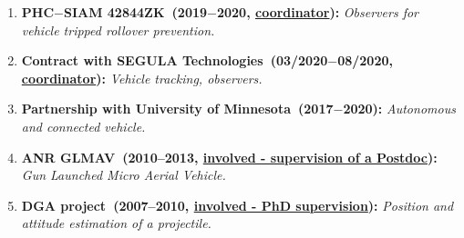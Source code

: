 \documentclass[a4paper,11pt]{article}
\begin{document}
 \begin{small}
\begin{enumerate}[leftmargin=.2in,noitemsep,nolistsep]
\item {\bf PHC$-$SIAM 42844ZK~(2019$-$2020, \underline{coordinator}):} {\it Observers for vehicle tripped rollover prevention.}
\item {\bf Contract with SEGULA Technologies~(03/2020$-$08/2020, \underline{coordinator}):} {\it Vehicle tracking, observers.}
\item {\bf Partnership with University of Minnesota~(2017$-$2020):} {\it Autonomous and connected vehicle.}
\item {\bf ANR GLMAV~(2010--2013, \underline{involved - supervision of a Postdoc}):} {\it Gun Launched Micro Aerial Vehicle.}
\item {\bf DGA project~(2007--2010, \underline{involved - PhD supervision}):} {\it Position and attitude estimation of a projectile.}
\end{enumerate}
 \end{small} %
 
\end{document}
